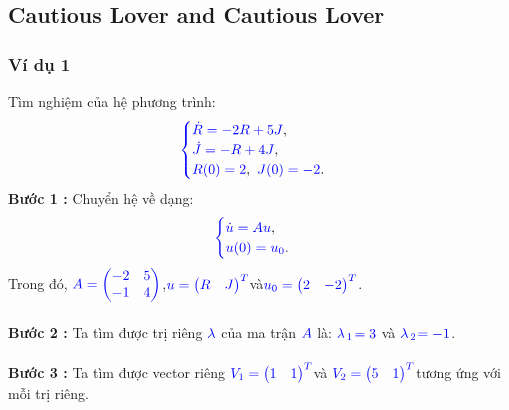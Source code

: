\documentclass[a4paper]{article}
\begin{document}
\subsection{Cautious Lover and Cautious Lover}
\subsubsection{Ví dụ 1}
Tìm nghiệm của hệ phương trình:
\begin{align}
	    \textcolor{blue}{
	    \begin{cases}
            \dot R = -2R + 5J \textcolor{black}{,}\\
            \dot J = -R + 4J \textcolor{black}{,}\\
            R(0) = 2\textcolor{black}{,} \enskip J(0) = -2 \textcolor{black}{.}
        \end{cases}
        }
        \notag
	\end{align}
{\bfseries Bước 1 :} Chuyển hệ về dạng:
\begin{align}
	    \textcolor{blue}{
	    \begin{cases}
            \dot u = Au \textcolor{black}{,}\\
            u(0) = u\sb{0}\textcolor{black}{.}
        \end{cases}
        }
       \notag
	\end{align}
Trong đó,  $\textcolor{blue}{A = \begin{pmatrix} -2 & 5\\ -1 & 4 \end{pmatrix}}$,\enskip $\textcolor{blue}{u = \begin{pmatrix} R & J \end{pmatrix}\sp{T}}$\enskip và\enskip $\textcolor{blue}{u\sb{0} = \begin{pmatrix} 2 & -2 \end{pmatrix}\sp{T}}$.\\\\
{\bfseries Bước 2 :} Ta tìm được trị riêng $\textcolor{blue}{\lambda}$ của ma trận $\textcolor{blue}{A}$ là: $\textcolor{blue}{\lambda}$$\textcolor{blue}{\sb{1}}$$\textcolor{blue}{=3}$ và $\textcolor{blue}{\lambda}$$\textcolor{blue}{\sb{2}}$$\textcolor{blue}{=-1}$.\\\\
{\bfseries Bước 3 :} Ta tìm được vector riêng \enskip $\textcolor{blue}{V\sb{1} = \begin{pmatrix} 1 & 1 \end{pmatrix}\sp{T}}$\enskip và \enskip $\textcolor{blue}{V\sb{2} = \begin{pmatrix} 5 & 1 \end{pmatrix}\sp{T}}$\enskip tương ứng với mỗi trị riêng.\\\\
\end{document}
